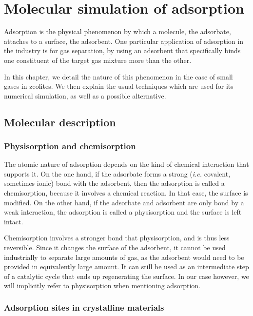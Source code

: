 \documentclass[main.tex]{subfiles}
\begin{document}
\chapter{Molecular simulation of adsorption}\label{adsorption}
\clearpage

Adsorption is the physical phenomenon by which a molecule, the adsorbate, attaches to a surface, the adsorbent. One particular application of adsorption in the industry is for gas separation, by using an adsorbent that specifically binds one constituent of the target gas mixture more than the other.

In this chapter, we detail the nature of this phenomenon in the case of small gases in zeolites. We then explain the usual techniques which are used for its numerical simulation, as well as a possible alternative.

\section{Molecular description}

\subsection{Physisorption and chemisorption}

The atomic nature of adsorption depends on the kind of chemical interaction that supports it. On the one hand, if the adsorbate forms a strong (\textit{i.e.} covalent, sometimes ionic) bond with the adsorbent, then the adsorption is called a chemisorption, because it involves a chemical reaction. In that case, the surface is modified. On the other hand, if the adsorbate and adsorbent are only bond by a weak interaction, the adsorption is called a physisorption and the surface is left intact.

Chemisorption involves a stronger bond that physisorption, and is thus less reversible. Since it changes the surface of the adsorbent, it cannot be used industrially to separate large amounts of gas, as the adsorbent would need to be provided in equivalently large amount. It can still be used as an intermediate step of a catalytic cycle that ends up regenerating the surface. In our case however, we will implicitly refer to physisorption when mentioning adsorption.

\subsection{Adsorption sites in crystalline materials}
\end{document}
